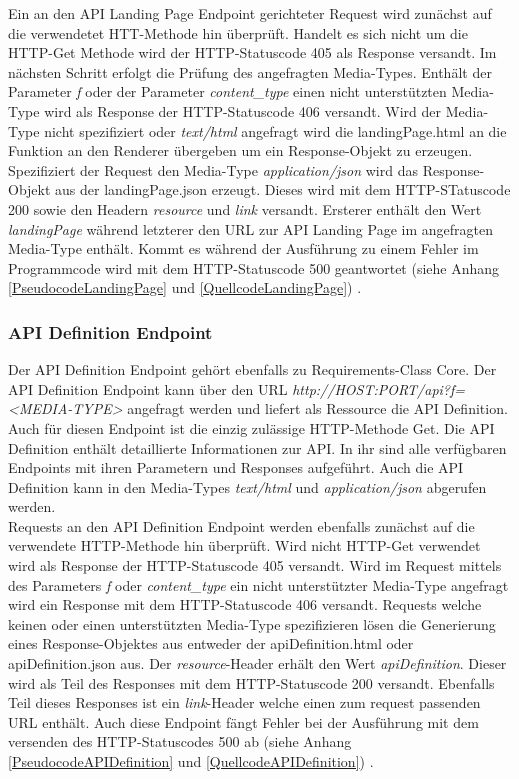 Ein an den API Landing Page Endpoint gerichteter Request wird zunächst auf die verwendetet HTT-Methode hin überprüft. Handelt es sich nicht um die HTTP-Get 
Methode wird der HTTP-Statuscode 405 als Response versandt. Im nächsten Schritt erfolgt die Prüfung des angefragten Media-Types. Enthält der Parameter \textit{f} 
oder der Parameter \textit{content\_type} einen nicht unterstützten Media-Type wird als Response der HTTP-Statuscode 406 versandt. Wird der Media-Type nicht spezifiziert oder
\textit{text/html} angefragt wird die landingPage.html an die Funktion an den Renderer übergeben um ein Response-Objekt zu erzeugen. Spezifiziert der Request 
den Media-Type \textit{application/json} wird das Response-Objekt aus der landingPage.json erzeugt. Dieses wird mit dem HTTP-STatuscode 200 sowie den Headern
\textit{resource} und \textit{link} versandt. Ersterer enthält den Wert \textit{landingPage} während letzterer den URL zur API Landing Page im angefragten Media-Type 
enthält. Kommt es während der Ausführung zu einem Fehler im Programmcode wird mit dem HTTP-Statuscode 500 geantwortet
(siehe Anhang \ref{PseudocodeLandingPage} und \ref{QuellcodeLandingPage}) \cite{ogc_api_processes_core}. 

\subsubsection{API Definition Endpoint}
Der API Definition Endpoint gehört ebenfalls zu Requirements-Class Core.
Der API Definition Endpoint kann über den URL \textit{http://HOST:PORT/api?f=<MEDIA-TYPE>} angefragt werden und liefert als Ressource die API Definition. 
Auch für diesen Endpoint ist die einzig zulässige HTTP-Methode Get. 
Die API Definition enthält detaillierte Informationen zur API. In ihr sind alle verfügbaren Endpoints mit ihren Parametern und Responses aufgeführt. 
Auch die API Definition kann in den Media-Types \textit{text/html} und \textit{application/json} abgerufen werden.\\
   
Requests an den API Definition Endpoint werden ebenfalls zunächst auf die verwendete HTTP-Methode hin überprüft. Wird nicht HTTP-Get verwendet wird als 
Response der HTTP-Statuscode 405 versandt. Wird im Request mittels des Parameters \textit{f} 
oder \textit{content\_type} ein nicht unterstützter Media-Type angefragt wird ein Response mit dem HTTP-Statuscode 406 versandt. 
Requests welche keinen oder einen unterstützten Media-Type spezifizieren lösen die Generierung eines Response-Objektes aus entweder der apiDefinition.html oder 
apiDefinition.json aus. Der \textit{resource}-Header erhält den Wert \textit{apiDefinition}. Dieser wird als Teil des Responses mit dem HTTP-Statuscode 200 versandt.
Ebenfalls Teil dieses Responses ist ein \textit{link}-Header welche einen zum request passenden URL enthält. Auch diese Endpoint fängt Fehler bei der
Ausführung mit dem versenden des HTTP-Statuscodes 500 ab (siehe Anhang \ref{PseudocodeAPIDefinition} und \ref{QuellcodeAPIDefinition}) 
\cite{ogc_api_processes_core}. 

